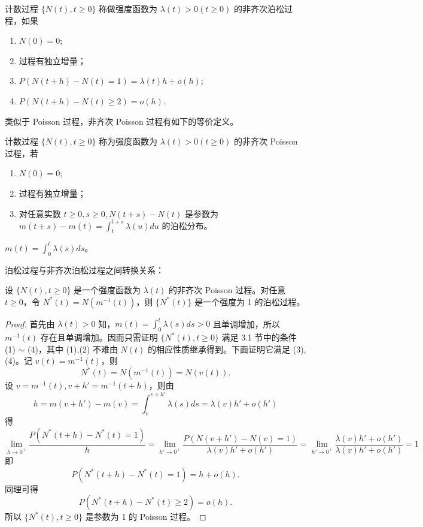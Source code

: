 \documentclass[lang=cn,10pt,thmcnt=section]{elegantbook}
\begin{document}
\begin{definition}
	计数过程 $\{N(t), t \geq 0\}$ 称做强度函数为 $\lambda(t) > 0 (t \geq 0)$ 的非齐次泊松过程，如果
\begin{enumerate}
    \item $N(0) = 0$;
    \item 过程有独立增量；
    \item $P(N(t+h) - N(t) = 1) = \lambda(t)h + o(h)$;
    \item $P(N(t+h) - N(t) \geq 2) = o(h)$.
\end{enumerate}
\end{definition}
类似于 Poisson 过程，非齐次 Poisson 过程有如下的等价定义。

\begin{definition}
	计数过程 $\{N(t), t \geq 0\}$ 称为强度函数为 $\lambda(t) > 0 (t \geq 0)$ 的非齐次 Poisson 过程，若
\begin{enumerate}
    \item $N(0) = 0$;
    \item 过程有独立增量；
    \item 对任意实数 $t \geq 0, s \geq 0, N(t+s) - N(t)$ 是参数为 $m(t+s) - m(t) = \int_{t}^{t+s} \lambda(u) du$ 的泊松分布。
\end{enumerate}
\end{definition}
\begin{remark}
	\(m(t) = \int_{0}^{t} \lambda(s) ds\)。

\end{remark}
泊松过程与非齐次泊松过程之间转换关系：

\begin{theorem}
	设 $\{N(t), t \geq 0\}$ 是一个强度函数为 $\lambda(t)$ 的非齐次 Poisson 过程。对任意 $t \geq 0$，令 $N^*(t) = N(m^{-1}(t))$，则 $\{N^*(t)\}$ 是一个强度为 1 的泊松过程。
\end{theorem}
\begin{proof}
	首先由 $\lambda(t) > 0$ 知，$m(t) = \int_{0}^{t} \lambda(s) ds > 0$ 且单调增加，所以 $m^{-1}(t)$ 存在且单调增加。因而只需证明 $\{N^*(t), t \geq 0\}$ 满足 3.1 节中的条件 (1) $\sim$ (4)，其中 (1),(2) 不难由 $N(t)$ 的相应性质继承得到。下面证明它满足 (3),(4)。记 $v(t) = m^{-1}(t)$，则
\[
N^*(t) = N(m^{-1}(t)) = N(v(t)).
\]
设 $v = m^{-1}(t), v + h' = m^{-1}(t + h)$，则由
\[
h = m(v + h') - m(v) = \int_{v}^{v+h'} \lambda(s) ds = \lambda(v) h' + o(h')
\]
得
\[
\lim_{h \to 0^+} \frac{P(N^*(t + h) - N^*(t) = 1)}{h} = \lim_{h' \to 0^+} \frac{P(N(v + h') - N(v) = 1)}{\lambda(v) h' + o(h')} = \lim_{h' \to 0^+} \frac{\lambda(v) h' + o(h')}{\lambda(v) h' + o(h')} = 1
\]
即
\[
P(N^*(t + h) - N^*(t) = 1) = h + o(h).
\]
同理可得
\[
P(N^*(t + h) - N^*(t) \geq 2) = o(h).
\]
所以 $\{N^*(t), t \geq 0\}$ 是参数为 1 的 Poisson 过程。
\end{proof}
\end{document}
